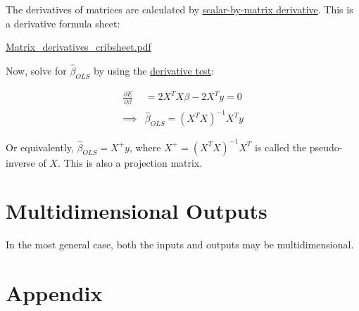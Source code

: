 \documentclass[12pt,a4paper]{article}
\begin{document}
The derivatives of matrices are calculated by
\href{https://en.wikipedia.org/wiki/Matrix_calculus\#Scalar-by-matrix}{scalar-by-matrix
derivative}. This is a derivative formula sheet:

\href{http://www.gatsby.ucl.ac.uk/teaching/courses/sntn/sntn-2017/resources/Matrix_derivatives_cribsheet.pdf}{Matrix\_derivatives\_cribsheet.pdf}

Now, solve for \(\hat\beta_{OLS}\) by using the
\href{https://en.wikipedia.org/wiki/Derivative_test}{derivative test}:

\begin{align}\frac{\partial E}{\partial \beta} &= 2 X^TX \beta-2X^Ty=0\\\implies&\hat\beta_{OLS}=(X^TX)^{-1}X^Ty\end{align}

Or equivalently, \(\hat\beta_{OLS}=X^+y\), where \(X^+=(X^TX)^{-1}X^T\)
is called the pseudo-inverse of \(X\). This is also a projection matrix.

\section{Multidimensional Outputs}

In the most general case, both the inputs and outputs may be
multidimensional.

\section{Appendix}
\end{document}
